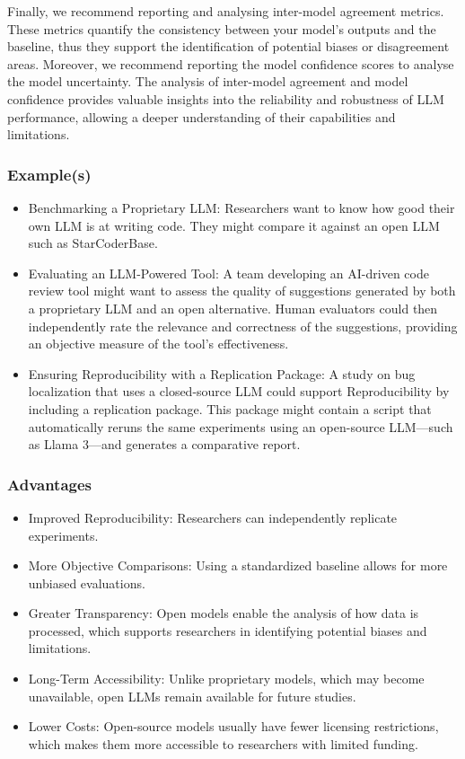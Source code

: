 Finally, we recommend reporting and analysing inter-model agreement metrics. These metrics quantify the consistency between your model's outputs 
and the baseline, thus they support the identification of potential biases or disagreement areas.  Moreover, we recommend reporting the model 
confidence scores to analyse the model uncertainty. The analysis of inter-model agreement and model confidence provides valuable insights into 
the reliability and robustness of LLM performance, allowing a deeper understanding of their capabilities and limitations.

\subsubsection{Example(s)}
\begin{itemize}
    \item Benchmarking a Proprietary LLM: Researchers want to know how good their own LLM is at writing code. They might compare it against an open LLM such as StarCoderBase.
    \item Evaluating an LLM-Powered Tool: A team developing an AI-driven code review tool might want to assess the quality of suggestions generated by both a proprietary LLM and an open alternative. Human evaluators could then independently rate the relevance and correctness of the suggestions, providing an objective measure of the tool's effectiveness.
    \item Ensuring Reproducibility with a Replication Package: A study on bug localization that uses a closed-source LLM could support Reproducibility by including a replication package. This package might contain a script that automatically reruns the same experiments using an open-source LLM—such as Llama 3—and generates a comparative report.
\end{itemize}

\subsubsection{Advantages}
\begin{itemize}
    \item	Improved Reproducibility: Researchers can independently replicate experiments.
    \item	More Objective Comparisons: Using a standardized baseline allows for more unbiased evaluations.
    \item	Greater Transparency: Open models enable the analysis of how data is processed, which supports researchers in identifying potential biases and limitations.
    \item	Long-Term Accessibility: Unlike proprietary models, which may become unavailable, open LLMs remain available for future studies.
    \item	Lower Costs: Open-source models usually have fewer licensing restrictions, which makes them more accessible to researchers with limited funding.
\end{itemize}


